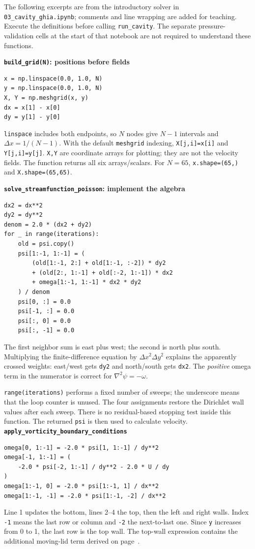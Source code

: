 \newpage
{}\label{sec:code-start}
The following excerpts are from the introductory solver in \texttt{03\_cavity\_ghia.ipynb}; comments and line wrapping are added for teaching. Execute the definitions before calling \texttt{run\_cavity}. The separate pressure-validation cells at the start of that notebook are not required to understand these functions.

\textbf{\texttt{build\_grid(N)}: positions before fields}
\begin{lstlisting}
x = np.linspace(0.0, 1.0, N)
y = np.linspace(0.0, 1.0, N)
X, Y = np.meshgrid(x, y)
dx = x[1] - x[0]
dy = y[1] - y[0]
\end{lstlisting}
\texttt{linspace} includes both endpoints, so $N$ nodes give $N-1$ intervals and $\Delta x=1/(N-1)$. With the default \texttt{meshgrid} indexing, \texttt{X[j,i]=x[i]} and \texttt{Y[j,i]=y[j]}. \texttt{X,Y} are coordinate arrays for plotting; they are not the velocity fields. The function returns all six arrays/scalars. For $N=65$, \texttt{x.shape=(65,)} and \texttt{X.shape=(65,65)}.

\textbf{\texttt{solve\_streamfunction\_poisson}: implement the algebra}
\begin{lstlisting}
dx2 = dx**2
dy2 = dy**2
denom = 2.0 * (dx2 + dy2)
for _ in range(iterations):
    old = psi.copy()
    psi[1:-1, 1:-1] = (
        (old[1:-1, 2:] + old[1:-1, :-2]) * dy2
        + (old[2:, 1:-1] + old[:-2, 1:-1]) * dx2
        + omega[1:-1, 1:-1] * dx2 * dy2
    ) / denom
    psi[0, :] = 0.0
    psi[-1, :] = 0.0
    psi[:, 0] = 0.0
    psi[:, -1] = 0.0
\end{lstlisting}
The first neighbor sum is east plus west; the second is north plus south. Multiplying the finite-difference equation by $\Delta x^2\Delta y^2$ explains the apparently crossed weights: east/west gets \texttt{dy2} and north/south gets \texttt{dx2}. The \emph{positive} omega term in the numerator is correct for $\nabla^2\psi=-\omega$.

\texttt{range(iterations)} performs a fixed number of sweeps; the underscore means that the loop counter is unused. The four assignments restore the Dirichlet wall values after each sweep. There is no residual-based stopping test inside this function. The returned \texttt{psi} is then used to calculate velocity.
\newpage
{}
\textbf{\texttt{apply\_vorticity\_boundary\_conditions}}
\begin{lstlisting}
omega[0, 1:-1] = -2.0 * psi[1, 1:-1] / dy**2
omega[-1, 1:-1] = (
    -2.0 * psi[-2, 1:-1] / dy**2 - 2.0 * U / dy
)
omega[1:-1, 0] = -2.0 * psi[1:-1, 1] / dx**2
omega[1:-1, -1] = -2.0 * psi[1:-1, -2] / dx**2
\end{lstlisting}
Line 1 updates the bottom, lines 2--4 the top, then the left and right walls. Index \texttt{-1} means the last row or column and \texttt{-2} the next-to-last one. Since \texttt{y} increases from 0 to 1, the last row is the top wall. The top-wall expression contains the additional moving-lid term derived on page~\pageref{sec:boundary}.

